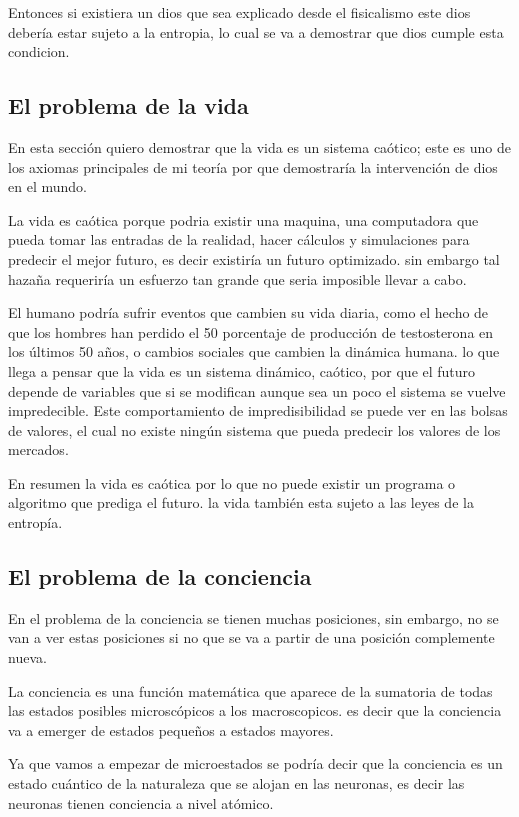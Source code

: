 \documentclass[12pt,letterpaper, a4paper ]{article}
\begin{document}
Entonces si existiera un dios que sea explicado desde el fisicalismo este dios debería estar sujeto a la entropia, lo cual se va a demostrar que dios cumple esta condicion.

\subsection{El problema de la vida}

En esta sección quiero demostrar que la vida es un sistema caótico; este es uno de los axiomas principales de mi teoría por que demostraría la intervención de dios en el mundo. 

La vida es caótica porque podria existir una maquina, una computadora que pueda tomar las entradas de la realidad, hacer cálculos y simulaciones para predecir el mejor futuro, es decir existiría un futuro optimizado. sin embargo tal hazaña requeriría  un esfuerzo tan grande que seria imposible llevar a cabo.

El humano podría sufrir eventos que cambien su vida diaria, como el hecho de que los hombres han perdido el 50 porcentaje de producción de testosterona en los últimos 50 años, o cambios sociales que cambien la dinámica humana. lo que llega a pensar que la vida es un sistema dinámico, caótico, por que el futuro 
depende de variables que si se modifican aunque sea un poco el sistema se vuelve impredecible. Este comportamiento de impredisibilidad se puede ver en las bolsas de valores, el cual no existe ningún sistema que pueda predecir los valores de los mercados.

En resumen la vida es caótica por lo que no puede existir un programa o algoritmo que prediga el futuro. la vida también esta sujeto a las leyes de la entropía.

\subsection{El problema de la conciencia}
En el problema de la conciencia se tienen muchas posiciones, sin embargo, no se van a ver estas posiciones si no que se va a partir de una posición complemente nueva.

La conciencia es una función matemática que aparece de la sumatoria de todas las estados posibles microscópicos a los macroscopicos. es decir que la conciencia va a emerger de estados pequeños a estados mayores. 

Ya que vamos a empezar de microestados se podría decir que la conciencia es un estado cuántico de la naturaleza que se alojan en las neuronas, es decir las neuronas tienen conciencia a nivel atómico.
\end{document}
